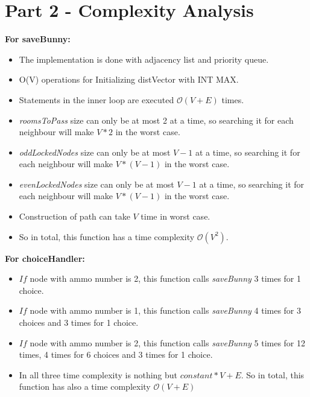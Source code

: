 \documentclass[10pt]{article}
\begin{document}
\section*{Part 2 - Complexity Analysis}
\hspace{4mm}	
\textbf{For saveBunny:} 
\begin{itemize}
	\item The implementation is done with adjacency list and priority queue.
	\item O(V) operations for Initializing distVector with INT MAX.
	\item Statements in the inner loop are executed $\mathcal{O}(V+E)$ times.
	\item \textit{roomsToPass} size can only be at most 2 at a time, so searching it for each neighbour will make $V*2$ in the worst case.
	\item \textit{oddLockedNodes} size can only be at most $V-1$ at a time, so searching it for each neighbour will make $V*(V-1)$ in the worst case.
	\item \textit{evenLockedNodes} size can only be at most $V-1$ at a time, so searching it for each neighbour will make $V*(V-1)$ in the worst case.
	\item Construction of path can take $V$ time in worst case.
	\item So in total, this function has a time complexity $\mathcal{O}(V^2)$.
\end{itemize} 
\textbf{For choiceHandler:}
\begin{itemize}
	\item $If$ node with ammo number is 2, this function calls \textit{saveBunny} 3 times for 1 choice.
	\item $If$ node with ammo number is 1, this function calls \textit{saveBunny} 4 times for 3 choices and 3 times for 1 choice.
	\item $If$ node with ammo number is 2, this function calls \textit{saveBunny} 5 times for 12 times, 4 times for 6 choices and 3 times for 1 choice.
	\item In all three time complexity is nothing but $constant * V+E$. So in total, this function has also a time complexity $\mathcal{O}(V+E)$
\end{itemize}
\end{document}
